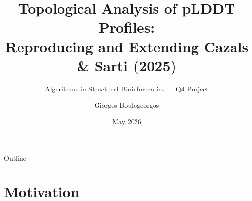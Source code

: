\documentclass[aspectratio=169, 10pt]{beamer}
\title[pLDDT Fragmentation via TDA]{%
  Topological Analysis of pLDDT Profiles:\\[4pt]
  Reproducing and Extending Cazals \& Sarti (2025)%
}
\subtitle{Algorithms in Structural Bioinformatics — Q4 Project}
\author{Giorgos Boulogeorgos}
\institute{Supervisor: Professor I. Emiris \and Co-advisor: P. Rigas}
\date{May 2026}
\begin{document}
\begin{frame}
  \titlepage
\end{frame}

\begin{frame}{Outline}
  \tableofcontents[hideallsubsections]
\end{frame}

\section{Motivation}
\end{document}
